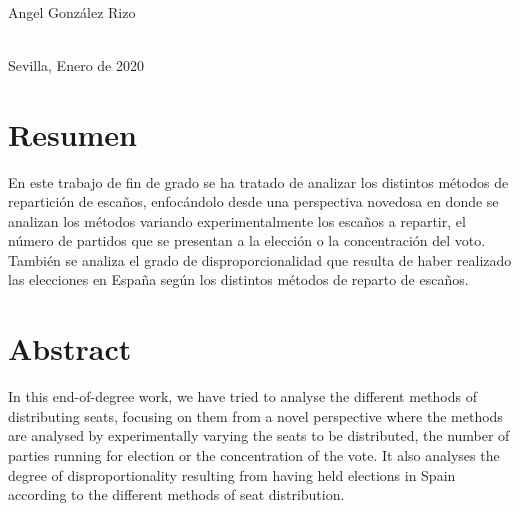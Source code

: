\documentclass[12pt,a4paper,]{book}
\def\ifdoblecara{} %
\numberwithin{dummy}{section}
\theoremstyle{ocrenumbox}
\theoremstyle{blacknumex}
\theoremstyle{blacknumbox}
\theoremstyle{ocrenum}
\theoremstyle{ocrenum}
\begin{document}
\begin{titlepage}
\begin{minipage}{14cm}
\HRule \\[4cm]


{\Large

Angel González Rizo} \\[0.5cm]

{\large
Sevilla, Enero de 2020
}

\end{minipage}

\vfill %

\cleardoublepage
\thispagestyle{empty}
\end{titlepage}

\raggedbottom

\setlength{\parindent}{1em}

\pagestyle{fancy}
\ifdefined\ifdoblecara
\fancyhead[LE,RO]{}
\fancyhead[LO,RE]{}
\else
\fancyhead[RO]{}
\fancyhead[LO]{}
\fi
\renewcommand{\headrulewidth}{0pt}
\renewcommand{\footrulewidth}{0pt}

\setcounter{tocdepth}{2}
\tableofcontents

\cleardoublepage

\section*{Resumen}

En este trabajo de fin de grado se ha tratado de analizar los distintos
métodos de repartición de escaños, enfocándolo desde una perspectiva
novedosa en donde se analizan los métodos variando experimentalmente los
escaños a repartir, el número de partidos que se presentan a la elección
o la concentración del voto. También se analiza el grado de
disproporcionalidad que resulta de haber realizado las elecciones en
España según los distintos métodos de reparto de escaños.

\clearpage
\section*{Abstract}

In this end-of-degree work, we have tried to analyse the different
methods of distributing seats, focusing on them from a novel perspective
where the methods are analysed by experimentally varying the seats to be
distributed, the number of parties running for election or the
concentration of the vote. It also analyses the degree of
disproportionality resulting from having held elections in Spain
according to the different methods of seat distribution.
\end{document}
